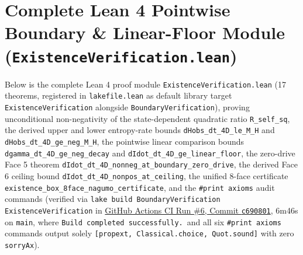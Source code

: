 \documentclass[11pt,a4paper]{article}
\theoremstyle{definition}
\begin{document}
\begin{table}[ht!]
\centering
\caption{Exact analytical and multi-solver (\texttt{LSODA}/\texttt{DOP853}, $\mathrm{rtol}=10^{-10}$ and $\mathrm{rtol}=10^{-12}$) comparison of the Minimum vs.\ Maximum corners of the 5-parameter control cube.}
\label{tab:minmax}
\vspace{4pt}
\end{table}

\section{Complete Lean 4 Pointwise Boundary \& Linear-Floor Module (\texttt{ExistenceVerification.lean})}
\label{sec:lean_code}

Below is the complete Lean 4 proof module \texttt{ExistenceVerification.lean} (17 theorems, registered in \texttt{lakefile.lean} as default library target \texttt{ExistenceVerification} alongside \texttt{BoundaryVerification}), proving unconditional non-negativity of the state-dependent quadratic ratio \texttt{R\_self\_sq}, the derived upper and lower entropy-rate bounds \texttt{dHobs\_dt\_4D\_le\_M\_H} and \texttt{dHobs\_dt\_4D\_ge\_neg\_M\_H}, the pointwise linear comparison bounds \texttt{dgamma\_dt\_4D\_ge\_neg\_decay} and \texttt{dIdot\_dt\_4D\_ge\_linear\_floor}, the zero-drive Face 5 theorem \texttt{dIdot\_dt\_4D\_nonneg\_at\_boundary\_zero\_drive}, the derived Face 6 ceiling bound \texttt{dIdot\_dt\_4D\_nonpos\_at\_ceiling}, the unified 8-face certificate \texttt{existence\_box\_8face\_nagumo\_certificate}, and the \texttt{\#print axioms} audit commands (verified via \texttt{lake build BoundaryVerification ExistenceVerification} in \href{https://github.com/reggaesharkk/theory-of-bounded-existence/commit/c690801}{GitHub Actions CI Run \#6, Commit \texttt{c690801}}, 6m46s on \texttt{main}, where \texttt{Build completed successfully.}\ and all six \texttt{\#print axioms} commands output solely \texttt{[propext, Classical.choice, Quot.sound]} with zero \texttt{sorryAx}).
\end{document}
